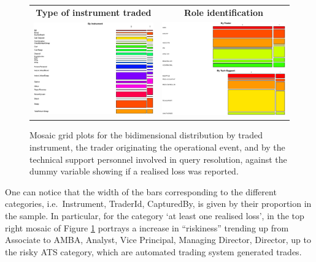 \documentclass[]{DissertateUSU}
\begin{document}
\begin{figure}
\begin{frame}
      \centering
       \begin{tabular}{cc}
        \textbf{Type of instrument traded} & \textbf{Role identification} \\
        \includegraphics[width=7.5cm]{Single_Instr.eps}
         &
         \includegraphics[width=7.5cm]{Stacked_TrId_TechSup.eps}
         \end{tabular}
    \end{frame}
    \caption{Mosaic grid plots for the bidimensional distribution by traded instrument, the trader originating the operational event, and by the technical support personnel involved in query resolution, against the dummy variable showing if a realised loss was reported.}
    \label{Mosaic_Instr_Trd_Tec}
\end{figure}

One can notice that the width of the bars corresponding to the different
categories, i.e.~Instrument, TraderId, CapturedBy, is given by their
proportion in the sample. In particular, for the category `at least one
realised loss', in the top right mosaic of Figure
\ref{Mosaic_Instr_Trd_Tec} portrays a increase in ``riskiness'' trending
up from Associate to AMBA, Analyst, Vice Principal, Managing Director,
Director, up to the risky ATS category, which are automated trading
system generated trades.\medskip
\end{document}
